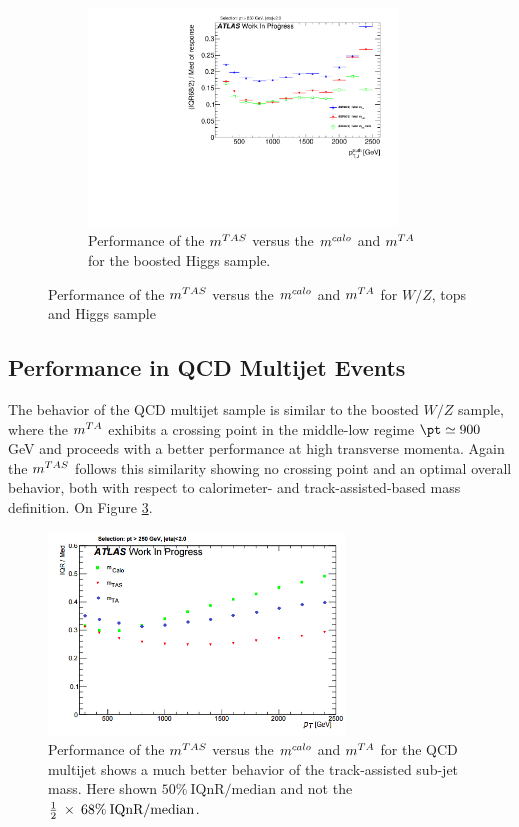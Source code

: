 \begin{figure}
\begin{subfigure}[b]{0.45\textwidth}
      \includegraphics[width=0.9\textwidth]{jet_part/mtas/71graphcftr_h_JetRatio_mJ12CALOIQRoMHiggs.pdf}
  \caption[$\mtas$ for boosted Higgs]{Performance of the $\mtas$ versus the $\mcal$ and $\mta$ for the boosted Higgs sample.}
  \label{fig:mtas4}
    \end{subfigure}

    \caption[Performance of the $\mtas$ versus the $\mcal$ and $\mta$]{Performance of the $\mtas$ versus the $\mcal$ and $\mta$ for $W/Z$, tops and Higgs sample} 
\end{figure}


\subsection{Performance in QCD Multijet Events}
The behavior of the QCD multijet sample is similar to the boosted $W/Z$ sample, where the $\mta$ exhibits a crossing point in the middle-low regime $\pt\simeq900$ GeV and proceeds with a better performance at high transverse momenta.
Again the $\mtas$ follows this similarity showing no crossing point and an optimal overall behavior, both with respect to calorimeter- and track-assisted-based mass definition. On Figure \ref{fig:mtas5}.

\begin{figure}[!ht]
  \centering
        \includegraphics[width=0.7\textwidth]{jet_part/mtas/qcdmtastruffa.png}
   \caption[$\mtas$ for QCD jets]{Performance of the $\mtas$ versus the $\mcal$ and $\mta$ for the QCD multijet shows a much better behavior of the track-assisted sub-jet mass. Here shown $50\% \:\textrm{IQnR/median}$ and not the $\frac{1}{2}\: \times\: 68\% \:\textrm{IQnR/median}$.}
  \label{fig:mtas5}
\end{figure}

